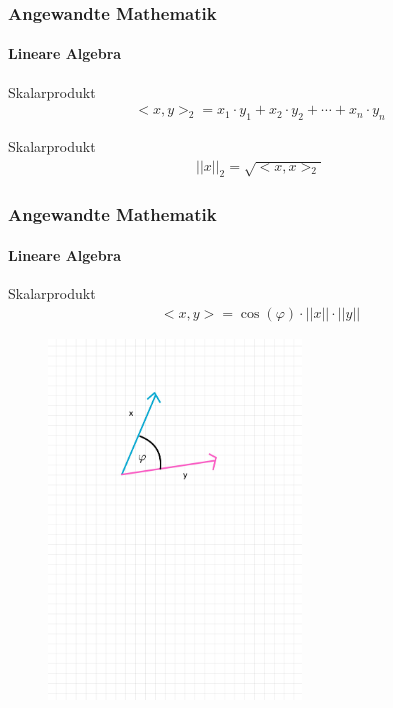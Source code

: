 \documentclass{beamer}
\begin{document}
\begin{frame}
    \frametitle{Angewandte Mathematik}
\framesubtitle{Lineare Algebra}
 \begin{block}{Skalarprodukt}
\begin{align*}
<x,y>_2 = x_1 \cdot y_1 + x_2 \cdot y_2 + \cdots + x_n \cdot y_n 
\end{align*}
\end{block}

 \begin{block}{Skalarprodukt}
\begin{align*}
||x||_2 = \sqrt{<x,x>_2} 
\end{align*}
\end{block}

 \end{frame}


\begin{frame}
    \frametitle{Angewandte Mathematik}
\framesubtitle{Lineare Algebra}
    \begin{block}{Skalarprodukt}
\begin{align*}
<x,y> = \cos(\varphi) \cdot ||x|| \cdot ||y||
\end{align*}
\end{block}
\begin{figure}[H]
      \centering
    \includegraphics[width=0.6\textwidth]{images/angle}
\end{figure}
 \end{frame}
\end{document}
